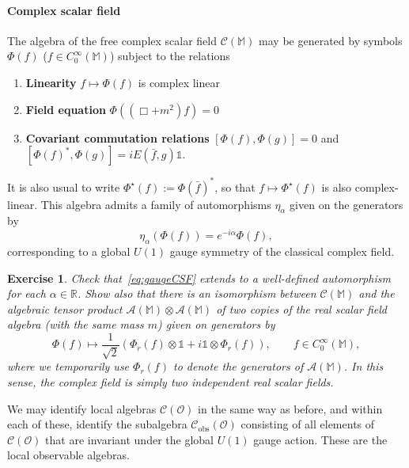 \documentclass[12pt,a4paper]{article}
\newcommand{\1}{\mathds{1}}                         %
\newcommand{\RR}{\mathbb{R}}           %
\newcommand{\Ocal}{\mathcal{O}}
\newcommand{\MM}{\mathbb{M}}
\newcommand{\II}{{\mathbb{1}}}
\newcommand{\Ac}{{\mathcal{A}}}
\newcommand{\Cc}{{\mathcal{C}}}
\newcommand{\CoinX}[1]{C_0^\infty(#1)}
\newtheorem{exercise}[theorem]{Exercise}
\begin{document}
	\paragraph{Complex scalar field} The algebra of the free complex scalar field $\Cc(\MM)$
	may be generated by symbols $\Phi(f)$ ($f\in\CoinX{\MM}$) subject to the relations
	\begin{enumerate}[label=\bf CF\arabic{enumi},leftmargin=*,widest=4] 
		\item\label{it:CFfieldcong} {\bf Linearity} $f\mapsto \Phi(f)$ is complex linear 
		\item\label{it:CFfieldeq} {\bf Field equation} $\Phi((\Box+ m^2)f)= 0$ 
		\item\label{it:CFfieldcom} {\bf Covariant commutation relations} $[\Phi(f),\Phi(g)]=0$ and $[\Phi(f)^*,\Phi(g)] = iE (\bar{f},g)\II$.
	\end{enumerate}
	It is also usual to write $\Phi^\star(f):=\Phi(\bar{f})^*$, so that $f\mapsto\Phi^\star(f)$ is  also complex-linear. This algebra admits a family of automorphisms $\eta_\alpha$ given on the generators by 
	\begin{equation}\label{eq:gaugeCSF}
	\eta_\alpha(\Phi(f))= e^{-i\alpha} \Phi(f),
	\end{equation}
	corresponding to a global $U(1)$ gauge symmetry of the classical complex field.  
	\begin{exercise}
	Check that~\eqref{eq:gaugeCSF} extends to a well-defined automorphism for each $\alpha\in\RR$. Show also that there is an isomorphism between $\Cc(\MM)$ and
	the algebraic tensor product $\Ac(\MM)\otimes\Ac(\MM)$ of two copies of the real scalar field algebra (with the same mass $m$) given on generators by  
	\[
	\Phi(f)\mapsto \frac{1}{\sqrt{2}}\left(\Phi_r(f)\otimes \II+i \II\otimes \Phi_r(f) \right), \qquad f\in\CoinX{\MM},
	\]
	where we temporarily use $\Phi_r(f)$ to denote the generators of $\Ac(\MM)$. In this sense, the complex field is simply two independent real scalar fields.	
	\end{exercise}
	We may identify local algebras $\Cc(\Ocal)$ in the same way as before, and within each of these, identify the subalgebra $\Cc_{\text{obs}}(\Ocal)$ consisting of all elements
	of $\Cc(\Ocal)$ that are invariant under the global $U(1)$ gauge action. These are the local observable algebras. 
	
\end{document}
